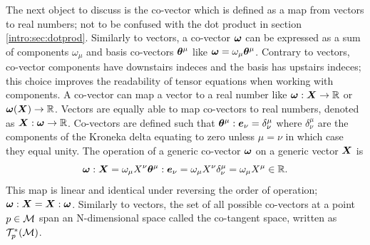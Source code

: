 The next object to discuss is the co-vector which is defined as a map from vectors to real numbers; not to be confused with the dot product in section \ref{intro:sec:dotprod}. Similarly to vectors, a co-vector $\boldsymbol{\omega}$ can be expressed as a sum of components $\omega_\mu$ and basis co-vectors $\boldsymbol{\theta}^\mu$ like $\boldsymbol{\omega} = \omega_\mu \boldsymbol{\theta}^\mu$. Contrary to vectors, co-vector components have downstairs indeces and the basis has upstairs indeces; this choice improves the readability of tensor equations when working with components. A co-vector can map a vector to a real number like $\boldsymbol{\omega}:\boldsymbol{X} \rightarrow \mathbb{R}$ or $\boldsymbol{\omega}(\boldsymbol{X}) \rightarrow \mathbb{R}$. Vectors are equally able to map co-vectors to real numbers, denoted as $\boldsymbol{X}:\boldsymbol{\omega}\rightarrow\mathbb{R}$. Co-vectors are defined such that $\boldsymbol{\theta}^\mu : \boldsymbol{e}_\nu = \delta^\mu_\nu$ where $\delta^\mu_\nu$ are the components of the Kroneka delta equating to zero unless $\mu=\nu$ in which case they equal unity. The operation of a generic co-vector $\boldsymbol{\omega}$ on a generic vector $\boldsymbol{X}$ is
\begin{equation}
\boldsymbol{\omega}: \boldsymbol{X} = \omega_\mu X^\nu \boldsymbol{\theta}^\mu:\boldsymbol{e}_\nu = \omega_\mu X^\nu \delta^\mu_\nu = \omega_\mu X^\mu \in \mathbb{R}.
\end{equation}
This map is linear and identical under reversing the order of operation; $\boldsymbol{\omega} : \boldsymbol{X} = \boldsymbol{X} : \boldsymbol{\omega}$. Similarly to vectors, the set of all possible co-vectors at a point $p\in\mathcal{M}$ span an N-dimensional space called the co-tangent space, written as $\mathcal{T}^*_p(\mathcal{M})$. 

